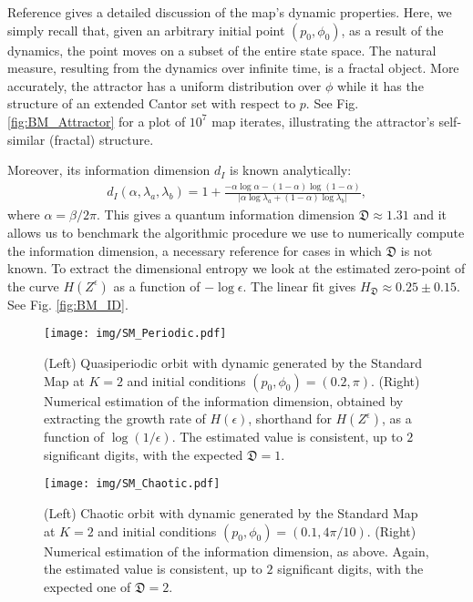\documentclass[draft,nofootinbib,pre,twocolumn,showkeys,superscriptaddress,preprintnumbers,floatfix]{revtex4-1}
\newcommand{\1}{\mathbbm{1}}
\newcommand{\DD}{\mathfrak{D}}
\begin{document}
Reference \cite{Farm83} gives a detailed discussion of the map's dynamic
properties. Here, we simply recall that, given an arbitrary initial point
$(p_0,\phi_0)$, as a result of the dynamics, the point moves on a subset of the
entire state space. The natural measure, resulting from the dynamics
over infinite time, is a fractal object. More accurately, the attractor has a
uniform distribution over $\phi$ while it has the structure of an extended
Cantor set with respect to $p$. See Fig. \ref{fig:BM_Attractor} for a plot of
$10^7$ map iterates, illustrating the attractor's self-similar (fractal)
structure.

Moreover, its information dimension $d_I$ is known analytically:
\begin{align}
d_I(\alpha,\lambda_a,\lambda_b)  = 1+\frac{-\alpha \log \alpha - (1-\alpha) \log (1-\alpha) }{|\alpha \log \lambda_a + (1-\alpha)\log \lambda_b| }
  ,
\label{eq:ID_BM}
\end{align}
where $\alpha = \beta/2\pi$. This gives a quantum information dimension $\DD
\approx 1.31$ and it allows us to benchmark the algorithmic procedure we use to
numerically compute the information dimension, a necessary reference for cases
in which $\DD$ is not known. To extract the dimensional entropy we look at the
estimated zero-point of the curve $H(Z^\epsilon)$ as a function of $-\log
\epsilon$. The linear fit gives $H_{\DD} \approx 0.25 \pm 0.15$. See Fig.
\ref{fig:BM_ID}.

\begin{figure}[h]
\centering
\texttt{[image: img/SM\_Periodic.pdf]}
\caption{(Left) Quasiperiodic orbit with dynamic generated by the Standard Map
	at $K=2$ and initial conditions $(p_0,\phi_0)=(0.2,\pi)$. (Right) Numerical
	estimation of the information dimension, obtained by extracting the growth
	rate of $H(\epsilon)$, shorthand for $H(Z^\epsilon)$, as a function of
	$\log(1/\epsilon)$. The estimated value is consistent, up to $2$
	significant digits, with the expected $\mathfrak{D}=1$. 
	}
\label{fig:ID_SM_Periodic} 
\end{figure}

\begin{figure}[h]
\centering
\texttt{[image: img/SM\_Chaotic.pdf]}
\caption{(Left) Chaotic orbit with dynamic generated by the Standard Map at
	$K=2$ and initial conditions $(p_0,\phi_0)=(0.1,4\pi/10)$. (Right)
	Numerical estimation of the information dimension, as above. Again, the
	estimated value is consistent, up to $2$ significant digits, with the
	expected one of $\mathfrak{D}=2$. 
	}
\label{fig:ID_SM_Chaotic} 
\end{figure}
\end{document}

